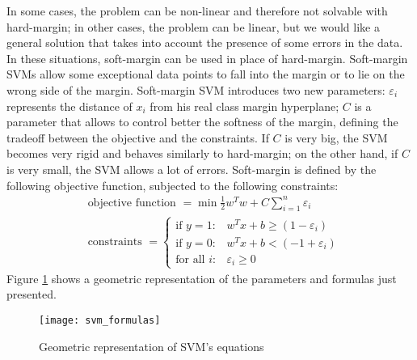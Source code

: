 In some cases, the problem can be non-linear and therefore not solvable with hard-margin; in other cases, the problem can be linear, but we would like a general solution that takes into account the presence of some errors in the data. In these situations, soft-margin can be used in place of hard-margin. Soft-margin SVMs allow some exceptional data points to fall into the margin or to lie on the wrong side of the margin. Soft-margin SVM introduces two new parameters: $\varepsilon_i$ represents the distance of $x_i$ from his real class margin hyperplane; $C$ is a parameter that allows to control better the softness of the margin, defining the tradeoff between the objective and the constraints. If $C$ is very big, the SVM becomes very rigid and behaves similarly to hard-margin; on the other hand, if $C$ is very small, the SVM allows a lot of errors. Soft-margin is defined by the following objective function, subjected to the following constraints:
\begin{align}
    &\text{objective function }= \min \frac{1}{2} w^{T} w + C \sum^{n}_{i=1} \varepsilon_i\\
    &\text{constraints }= \left\{\begin{array}{lll}{\text{if } y=1 :} & {w^{T} x+b \geq (1 - \varepsilon_i)} \\ {\text{if } y=0 :} & {w^{T} x+b < (-1 + \varepsilon_i)} \\ {\text{for all } i :} & {\varepsilon_i \geq 0}\end{array}\right.
\end{align}
Figure \ref{fig:svm_formulas} shows a geometric representation of the parameters and formulas just presented.
\begin{figure}[htbp]
    \centering
    \texttt{[image: svm\_formulas]}
    \caption{Geometric representation of SVM's equations}
    \label{fig:svm_formulas}
\end{figure}


